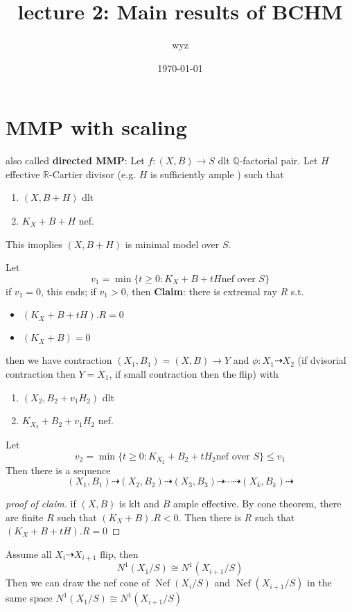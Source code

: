 \documentclass{article}
\title{lecture 2: Main results of BCHM}
\author{wyz}
\date{\today}
\begin{document}
  \maketitle

\section{MMP with scaling}
also called \textbf{directed MMP}:
Let $f:(X,B)\to S$ dlt $\mathbb{Q}$-factorial pair. Let $H$ effective $\mathbb{R}$-Cartier divisor (e.g.  $H$ is sufficiently ample ) such that
\begin{enumerate}
  \item $(X,B+H)$ dlt
  \item $K_{X}+B+H$ nef.
\end{enumerate}

This imoplies $(X,B+H)$ is minimal model over $S$. 

Let 
\[
v_{1}=\min \{t\geqslant 0: K_{X}+B+tH \text{nef over }S\} 
\]
if $v_{1}=0$, this ends; if $v_{1}>0$, then 
\textbf{Claim}: there is extremal ray $R$ s.t. 
\begin{itemize}
  \item 
    $(K_{X}+B+tH).R=0$
  \item $(K_{X}+B)=0$
\end{itemize}
then  we have contraction $(X_{1},B_{1})=(X,B)\to Y$ and $\phi: X_{1}\dashrightarrow X_{2}$ (if dvisorial contraction then $Y=X_{1}$, if small contraction then the flip) with
\begin{enumerate}
  \item $(X_{2},B_{2}+v_{1}H_{2})$ dlt
  \item $K_{X_{2}}+B_{2}+v_{1}H_{2}$ nef.
\end{enumerate}
Let 
\[
  v_{2}=\min \{t\geqslant 0: K_{X_{2}}+B_{2}+tH_{2} \text{nef over }S\} \leqslant v_{1}
\]
Then there is a sequence
\[
  (X_{1},B_{1})\dashrightarrow   (X_{2},B_{2})\dashrightarrow   (X_{3},B_{3})\dashrightarrow  \cdots\dashrightarrow  (X_{k},B_{k})\dashrightarrow 
\]
\begin{proof}[proof of claim]
  if $(X,B)$ is klt and $B$ ample effective. By cone theorem, there are finite $R$ such that $(K_{X}+B).R<0$. Then there is $R$ such that$(K_{X}+B+tH).R=0$
\end{proof}
Assume all $X_{i} \dashrightarrow X_{i+1}$ flip, then
\[
  N^1(X_{1}/S) \cong N^1(X_{i+1}/S)
\]
Then we can draw the nef cone of $\operatorname{Nef}(X_{i}/S)$ and $\operatorname{Nef}(X_{i+1}/S)$ in the same space $  N^1(X_{1}/S) \cong N^1(X_{i+1}/S)$ 
\end{document}
